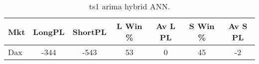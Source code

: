 \begin{table}[ht]
\centering
\caption[ts1 arima hybrid ANN.]{ts1 arima hybrid ANN.} 
\label{tab:chp_ts:arima_hybrid_ann}
\begin{tabular}{lcccccc}
  \toprule Mkt & LongPL & ShortPL & L Win \% & Av L PL & S Win \% & Av S PL \\ 
  \midrule Dax & -344 & -543 & 53 & 0 & 45 & -2 \\ 
   \bottomrule \end{tabular}
\end{table}
